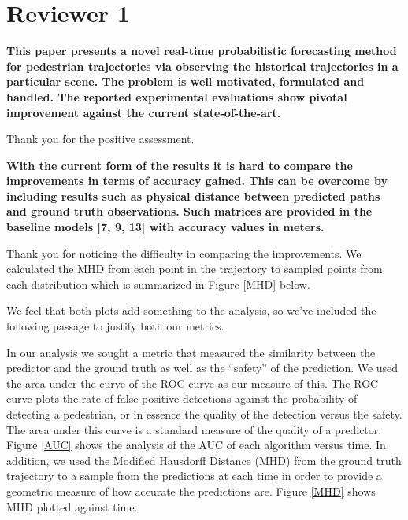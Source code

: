 \documentclass[usenames,dvipsnames]{article}
\providecommand{\response}[1]{
\noindent
\noindent\colorbox{gray!20}{
\parbox{\textwidth}{
\setlength{\parskip}{.1in}
\setlength{\parindent}{.1in}
#1}
}
}
\begin{document}
\section*{Reviewer 1}
\begin{enumerate}

\begin{item}
\textbf{This paper presents a novel real-time probabilistic forecasting method
for pedestrian trajectories via observing the historical trajectories
in a particular scene. The problem is well motivated, formulated and
handled. The reported experimental evaluations show pivotal improvement
against the current state-of-the-art.}

Thank you for the positive assessment.
\end{item}

\begin{item}
\textbf{With the current form of the results it is hard to compare the
improvements in terms of accuracy gained. This can be overcome by
including results such as physical distance between predicted paths and
ground truth observations. Such matrices are provided in the baseline
models [7, 9, 13] with accuracy values in meters. }

Thank you for noticing the difficulty in comparing the improvements. We calculated the MHD from each point in the trajectory to sampled points from each distribution which is summarized in Figure \ref{MHD} below. 

We feel that both plots add something to the analysis, so we've included the following passage to justify both our metrics.

\response{ In our analysis we sought a metric that measured the similarity between the predictor and the ground truth as well as the ``safety'' of the prediction. We used the area under the curve of the ROC curve as our measure of this. The ROC curve plots the rate of false positive detections against the probability of detecting a pedestrian, or in essence the quality of the detection versus the safety. The area under this curve is a standard measure of the quality of a predictor. Figure \ref{AUC} shows the analysis of the AUC of each algorithm versus time. In addition, we used the Modified Hausdorff Distance (MHD) from the ground truth trajectory to a sample from the predictions at each time in order to provide a geometric measure of how accurate the predictions are. Figure \ref{MHD} shows MHD plotted against time.}


\end{item}
\end{enumerate}
\end{document}
